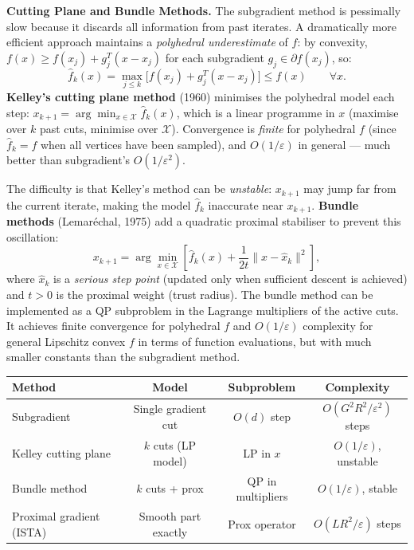 \documentclass[11pt,a4paper]{article}
\theoremstyle{definition}
\begin{document}
\noindent\textbf{Cutting Plane and Bundle Methods.} The subgradient method is pessimally slow because it discards all information from past iterates. A dramatically more efficient approach maintains a \emph{polyhedral underestimate} of $f$: by convexity, $f(x) \geq f(x_j) + g_j^T(x - x_j)$ for each subgradient $g_j \in \partial f(x_j)$, so:
\begin{equation}
\hat{f}_k(x) = \max_{j \leq k}\bigl[f(x_j) + g_j^T(x - x_j)\bigr] \leq f(x) \qquad \forall x.
\label{eq:cutting_plane_model}
\end{equation}
\textbf{Kelley's cutting plane method} (1960) minimises the polyhedral model each step:
$x_{k+1} = \arg\min_{x \in \mathcal{X}} \hat{f}_k(x)$, which is a linear programme in $x$ (maximise over $k$ past cuts, minimise over $\mathcal{X}$). Convergence is \emph{finite} for polyhedral $f$ (since $\hat{f}_k = f$ when all vertices have been sampled), and $O(1/\varepsilon)$ in general — much better than subgradient's $O(1/\varepsilon^2)$.

The difficulty is that Kelley's method can be \emph{unstable}: $x_{k+1}$ may jump far from the current iterate, making the model $\hat{f}_k$ inaccurate near $x_{k+1}$. \textbf{Bundle methods} (Lemaréchal, 1975) add a quadratic proximal stabiliser to prevent this oscillation:
\begin{equation}
x_{k+1} = \arg\min_{x \in \mathcal{X}} \left[\hat{f}_k(x) + \frac{1}{2t}\|x - \hat{x}_k\|^2\right],
\label{eq:bundle}
\end{equation}
where $\hat{x}_k$ is a \emph{serious step point} (updated only when sufficient descent is achieved) and $t > 0$ is the proximal weight (trust radius). The bundle method can be implemented as a QP subproblem in the Lagrange multipliers of the active cuts. It achieves finite convergence for polyhedral $f$ and $O(1/\varepsilon)$ complexity for general Lipschitz convex $f$ in terms of function evaluations, but with much smaller constants than the subgradient method.

\begin{center}
\begin{tabular}{lccc}
\toprule
Method & Model & Subproblem & Complexity \\
\midrule
Subgradient & Single gradient cut & $O(d)$ step & $O(G^2 R^2/\varepsilon^2)$ steps \\
Kelley cutting plane & $k$ cuts (LP model) & LP in $x$ & $O(1/\varepsilon)$, unstable \\
Bundle method & $k$ cuts + prox & QP in multipliers & $O(1/\varepsilon)$, stable \\
Proximal gradient (ISTA) & Smooth part exactly & Prox operator & $O(LR^2/\varepsilon)$ steps \\
\bottomrule
\end{tabular}
\end{center}
\end{document}
